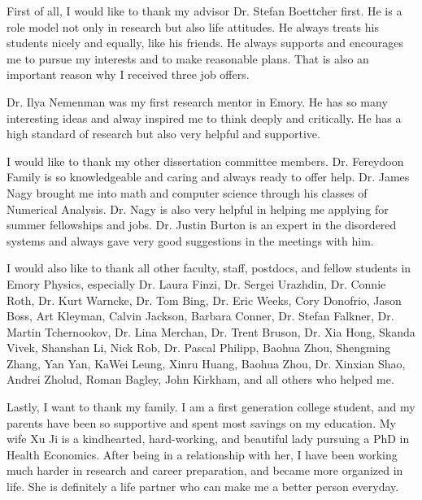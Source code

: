 \makecovertwo

\begin{acknowledgements}
First of all, I would like to thank my advisor Dr. Stefan Boettcher first. He is a role model not only in research but also life attitudes. He always treats his students nicely and equally, like his friends. He always supports and encourages me to pursue my interests and to make reasonable plans. That is also an important reason why I received three job offers.  

Dr. Ilya Nemenman was my first research mentor in Emory. He has so many interesting ideas and alway inspired me to think deeply and critically. He has a high standard of research but also very helpful and supportive.

I would like to thank my other dissertation committee members. Dr. Fereydoon Family is so knowledgeable and caring and always ready to offer help. Dr. James Nagy brought me into math and computer science through his classes of Numerical Analysis. Dr. Nagy is also very helpful in helping me applying for summer fellowships and jobs.  Dr. Justin Burton is an expert in the disordered systems and always gave very good suggestions in the meetings with him.  

I would also like to thank all other faculty, staff, postdocs, and fellow students in Emory Physics, especially Dr. Laura Finzi, Dr. Sergei Urazhdin, Dr. Connie Roth, Dr. Kurt Warncke, Dr. Tom Bing, Dr. Eric Weeks, Cory Donofrio, Jason Boss, Art Kleyman, Calvin Jackson, Barbara Conner, Dr. Stefan Falkner, Dr. Martin Tchernookov, Dr. Lina Merchan, Dr. Trent Bruson, Dr. Xia Hong, Skanda Vivek, Shanshan Li, Nick Rob, Dr. Pascal Philipp, Baohua Zhou, Shengming Zhang, Yan Yan, KaWei Leung, Xinru Huang, Baohua Zhou, Dr. Xinxian Shao, Andrei Zholud, Roman Bagley, John Kirkham, and all others who helped me. 

Lastly, I want to thank my family. I am a first generation college student, and my parents have been so supportive and spent most savings on my education. My wife Xu Ji is a kindhearted, hard-working, and beautiful lady pursuing a PhD in Health Economics. After being in a relationship with her, I have been working much harder in research and career preparation, and became more organized in life. She is definitely a life partner who can make me a better person everyday.



\end{acknowledgements}
\thesistableofcontents
\thesislistoftables
\thesislistoffigures


